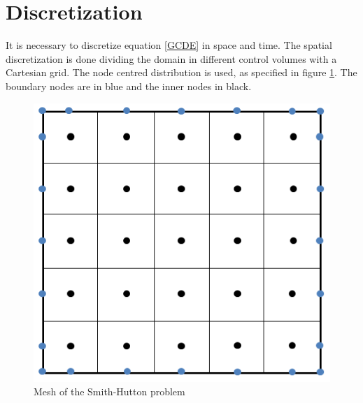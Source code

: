 \section{Discretization}
\label{DiscretizationSH}
It is necessary to discretize equation \ref{GCDE} in space and time. The spatial discretization is done dividing the domain in different control volumes with a Cartesian grid. The node centred distribution is used, as specified in figure \ref{SHmesh}. The boundary nodes are in blue and the inner nodes in black.
\begin{figure}
	\centering
	\includegraphics[scale=0.6]{SmithHutton/mesh}
	\caption{Mesh of the Smith-Hutton problem}
	\label{SHmesh}
\end{figure}

